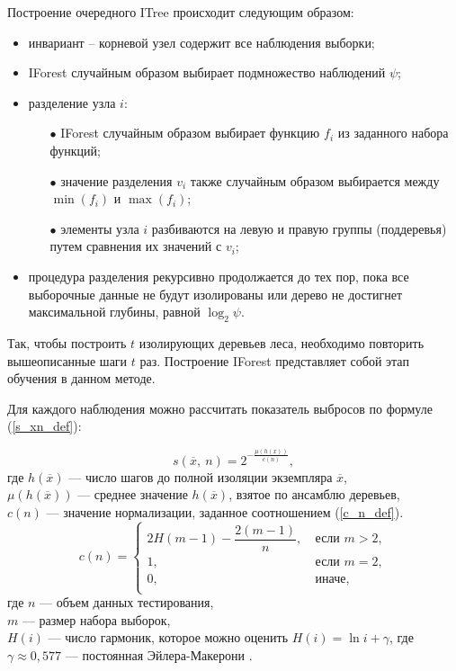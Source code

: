 Построение очередного ITree происходит следующим образом:
\begin{itemize}[leftmargin=0pt,itemindent=4.6em]
    \item инвариант – корневой узел содержит все наблюдения выборки;
    \item IForest случайным образом выбирает подмножество наблюдений $\psi$;
    \item разделение узла $i$: 
        \begin{itemize}[leftmargin=4.6em,itemindent=4.6em]
            \item[$\bullet$] IForest случайным образом выбирает функцию $f_i$  из заданного набора функций;
            \item[$\bullet$] значение разделения $v_i$ также случайным образом выбирается между $\min(f_i)$ и $\max(f_i)$;
            \item[$\bullet$] элементы узла $i$ разбиваются на левую и правую группы (поддеревья) путем сравнения их значений с $v_i$;
        \end{itemize}
    \item процедура разделения рекурсивно продолжается до тех пор, пока все выборочные данные не будут изолированы или дерево не достигнет максимальной глубины, равной $\log_2 \psi$.
\end{itemize}

Так, чтобы построить $t$ изолирующих деревьев леса, необходимо повторить вышеописанные шаги $t$ раз. Построение IForest представляет собой этап обучения в данном методе.

Для каждого наблюдения можно рассчитать показатель выбросов \cite{Isolation-Forest} по формуле (\ref{s_xn_def}):

\begin{equation}\label{s_xn_def}
    s(\overline{x},\ n) = 2^{-\tfrac{\mu(h(x))}{c(n)}},
\end{equation}
где $h(\overline{x})$ --- число шагов до полной изоляции экземпляра $\overline{x}$, \\
$\mu(h(\overline{x}))$ --- среднее значение $h(\overline{x})$, взятое по ансамблю деревьев, \\
$c(n)$ --- значение нормализации, заданное соотношением (\ref{c_n_def}). \\

\begin{equation}\label{c_n_def}
    c(n) = \begin{cases}
         2H(m - 1) - \dfrac{2(m - 1)}{n}, &\ \text{если } m > 2, \\
         1, &\ \text{если } m = 2, \\ 
         0, &\ \text{иначе}, \\ 
    \end{cases}
\end{equation}
где $n$ --- объем данных тестирования, \\
$m$ --- размер набора выборок, \\
$H(i)$ --- число гармоник, которое можно оценить $H(i)=\ln i + \gamma$, где $\gamma \approx 0,577$ --- постоянная Эйлера-Макерони \cite{Eiler-Maskeroni-Const}.

